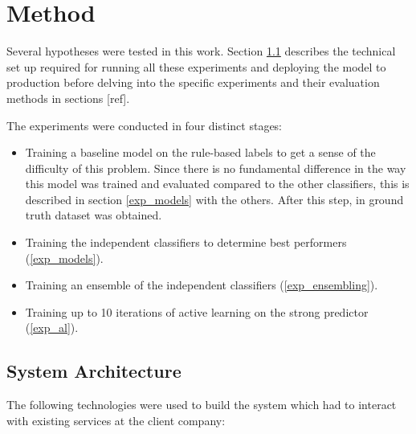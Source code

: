 \chapter{Method}


Several hypotheses were tested in this work.
Section \ref{architecture} describes the technical set up required for running all these experiments and deploying the model to production before delving into the specific experiments and their evaluation methods in sections [ref].

\hfill \break \noindent
The experiments were conducted in four distinct stages:

 \begin{itemize}
   \item Training a baseline model on the rule-based labels to get a sense of the difficulty of this problem. Since there is no fundamental difference in the way this model was  trained and evaluated compared to the other classifiers, this is described in section \ref{exp_models} with the others. After this step, in ground truth dataset was obtained.
   \item Training the independent classifiers to determine best performers (\ref{exp_models}).
   \item Training an ensemble of the independent classifiers (\ref{exp_ensembling}).
   \item Training up to 10 iterations of active learning on the strong predictor (\ref{exp_al}).
 \end{itemize}

\section{System Architecture}
\label{architecture}

 The following technologies were used to build the system which had to interact with existing services  at the client company:

